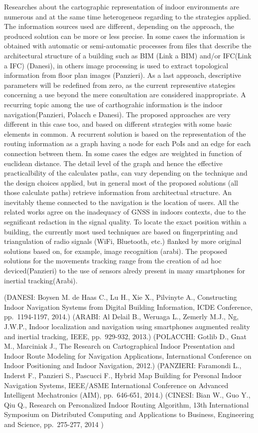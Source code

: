 \documentclass[]{article}
\begin{document}
Researches about the cartographic representation of indoor environments
are numerous and at the same time heterogeneos regarding to the
strategies applied. The information sources used are different,
depending on the approach, the produced solution can be more or less
precise. In some cases the information is obtained with automatic or
semi-automatic processes from files that describe the architectural
structure of a building such as BIM (Link a BIM) and/or IFC(Link a IFC)
(Danesi), in others image processing is used to extract topological
information from floor plan images (Panzieri). As a last approach,
descriptive parameters will be redefined from zero, as the current
representive stategies concerning a use beyond the mere consultation are
considered inappropriate. A recurring topic among the use of
carthograhic information is the indoor navigation(Panzieri, Polacch e
Danesi). The proposed approaches are very different in this case too,
and based on different strategies with some basic elements in common. A
recurrent solution is based on the representation of the routing
information as a graph having a node for each PoIs and an edge for each
connection between them. In some cases the edges are weighted in
function of euclidean distance. The detail level of the graph and hence
the effective practicalbility of the calculates paths, can vary
depending on the technique and the design choices applied, but in
general most of the proposed solutions (all those calculate paths)
retrieve information from architectual structure. An inevitably theme
connected to the navigation is the location of users. All the related
works agree on the inadequacy of GNSS in indoors contexts, due to the
segnificant redaction in the signal quality. To locate the exact
position within a building, the currently most used techniques are based
on fingerprinting and triangulation of radio signals (WiFi, Bluetooth,
etc.) flanked by more original solutions based on, for example, image
recognition (arabi). The proposed solutions for the movements tracking
range from the creation of ad hoc deviced(Panzieri) to the use of
sensors alredy present in many smartphones for inertial tracking(Arabi).

(DANESI: Boysen M. de Haas C., Lu H., Xie X., Pilvinyte A., Constructing
Indoor Navigation Systems from Digital Building Information, ICDE
Conference, pp.~1194-1197, 2014.) (ARABI: Al Delail B., Weruaga L.,
Zemerly M.J., Ng, J.W.P., Indoor localization and navigation using
smartphones augmented reality and inertial tracking, IEEE, pp.~929-932,
2013.) (POLACCHI: Gotlib D., Gnat M., Marciniak J., The Research on
Cartographical Indoor Presentation and Indoor Route Modeling for
Navigation Applications, International Conference on Indoor Positioning
and Indoor Navigation, 2012.) (PANZIERI: Faramondi L., Inderst F.,
Panzieri S., Pascucci F., Hybrid Map Building for Personal Indoor
Navigation Systems, IEEE/ASME International Conference on Advanced
Intelligent Mechatronics (AIM), pp.~646-651, 2014.) (CINESI: Bian W.,
Guo Y., Qiu Q., Research on Personalized Indoor Routing Algorithm, 13th
International Symposium on Distributed Computing and Applications to
Business, Engineering and Science, pp.~275-277, 2014 )
\end{document}
